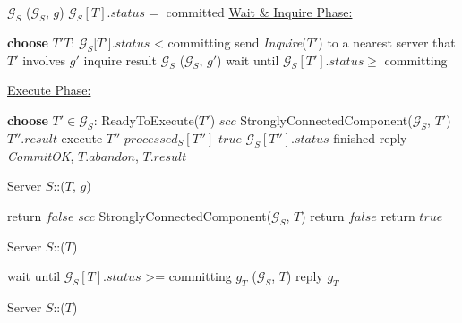 \begin{algorithm}
  \DontPrintSemicolon
  $\mathcal{G}_S$ ($\mathcal{G}_S$, $g$) \;
  $\mathcal{G}_S[T].status = $ {\sf committed} \;
  \underline{Wait \& Inquire Phase:} \;
   { \label{line:wait_commit_begin}
    {\bf choose} $T'$\TRAR$T$:
      $\mathcal{G}_S$[$T'$].$status$ < {\sf committing} \; 
       {
        send \emph{Inquire}($T'$) to a nearest server
        that $T'$ involves \;
        $g'$ \LAR inquire result \;
        $\mathcal{G}_S$ ($\mathcal{G}_S$, $g'$) \;
      }
      wait until $\mathcal{G}_S[T'].status \ge$ {\sf committing} \;

  } \label{line:wait_commit_end}
  \underline{Execute Phase:} \;
  
   {
    {\bf choose} $T' \in \mathcal{G}_S$: {\sc ReadyToExecute}($T'$) \;
    $scc$ {\LAR} {\sc StronglyConnectedComponent}($\mathcal{G}_S$, $T'$) \;
     {
       {
        $T''.result$ \LAR execute $T''$ \;
      }
      $processed_S[T'']$ \LAR $true$ \;
      $\mathcal{G}_S[T''].status$ {\LAR} {\sf finished} \;
    }
  }
  reply \emph{CommitOK}, $T.abandon$, $T.result$ \;
  \caption{Server $S$::($T$, $g$)}
\end{algorithm}


\begin{algorithm}[h]
  \DontPrintSemicolon
   {
    return $false$ \;
  }
  $scc$ {\LAR} {\sc StronglyConnectedComponent}($\mathcal{G}_S$, $T$) \;
   {
     {
      return $false$ \;
    }
  }
  return $true$ \;
  \caption{Server $S$::($T$)}
  \label{alg:prepare}
\end{algorithm}






\begin{algorithm}[h]
  \DontPrintSemicolon

  wait until $\mathcal{G}_S[T].status$ >= {\sf committing} \;
  $g_T$ ($\mathcal{G}_S$, $T$)\;
  reply $g_T$ \;
  \caption{Server $S$::($T$)}
  \label{alg:prepare}
\end{algorithm}


